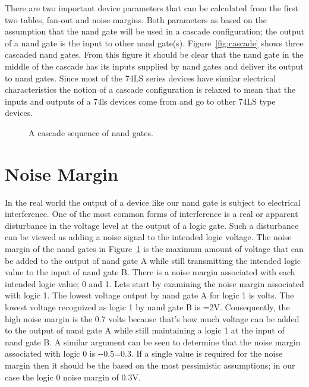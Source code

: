 There are two important device parameters that can be calculated 
from the first two tables, fan-out and noise margins.  Both parameters
as based on the assumption that the nand gate will be used in a cascade
configuration;  the output of a nand 
gate is the input to other nand gate(s).  Figure~\ref{fig:cascade} 
shows three cascaded nand gates.  From this figure it should be clear
that the nand gate in the middle of the cascade has its inputs
supplied by nand gates and deliver its output to nand gates.  Since
most of the 74LS series devices have similar electrical 
characteristics the notion of a cascade 
configuration is relaxed to mean that the inputs and outputs of a
74ls devices come from and go to other 74LS type devices.

\begin{figure}[ht]
\caption{A cascade sequence of nand gates.}
\label{fig:cascade_conf}
\end{figure}

\section{Noise Margin}
In the real world the output of a device like our nand gate is subject
to electrical interference.  One of the most common forms of interference 
is a real or apparent disturbance in the voltage level at the output of a 
logic gate.  Such a disturbance can be viewed as adding a noise signal to
the intended logic voltage.  The noise margin of the nand gates in 
Figure~\ref{fig:cascade_conf} is the maximum amount of voltage that can 
be added to the output of nand gate A while still transmitting the 
intended logic value to the input of nand gate B.  There is a noise 
margin associated with each intended logic value; 0 and 1.  Lets 
start by examining the noise margin associated with logic
1.  The lowest voltage output by nand gate A for logic 1 is 
volts.  The lowest voltage recognized as logic 1 by 
nand gate B is \VIH=2V.  Consequently, the high noise margin is the 0.7 
volts because that's how much voltage can be added to the output of
nand gate A while still maintaining a logic 1 at the input of nand gate
B. A similar argument can be seen to determine that the noise
margin associated with logic 0 is \VIL--0.5=0.3.  If a
single value is required for the noise margin then it should be
the based on the most pessimistic assumptions; in our case the  
logic 0 noise margin of 0.3V.


